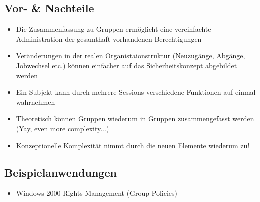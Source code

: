 \subsection*{Vor- \& Nachteile}
\begin{itemize}
	\item Die Zusammenfassung zu Gruppen ermöglicht eine vereinfachte Administration der gesamthaft vorhandenen Berechtigungen
	\item Veränderungen in der realen Organistaionstruktur (Neuzugänge, Abgänge, Jobwechsel etc.) können einfacher auf das Sicherheitskonzept abgebildet werden
	\item Ein Subjekt kann durch mehrere Sessions verschiedene Funktionen auf einmal wahrnehmen
	\item Theoretisch können Gruppen wiederum in Gruppen zusammengefasst werden (Yay, even more complexity...)
	\item Konzeptionelle Komplexität nimmt durch die neuen Elemente wiederum zu!
\end{itemize}

\subsection*{Beispielanwendungen}
\begin{itemize}
	\item Windows 2000 Rights Management (Group Policies)
\end{itemize}